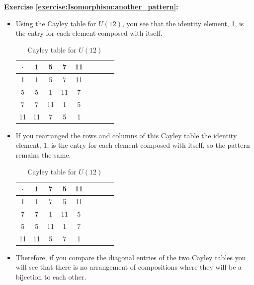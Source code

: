 \noindent\textbf{Exercise \ref{exercise:Isomorphism:another_pattern}:}
\begin{itemize}
\item
Using the Cayley table for $U(12)$, you see that the identity element, 1, is the entry for each element composed with itself.
\begin{table}[H]
\caption{Cayley table for $U(12)$}
{\small
\begin{center}
\begin{tabular}{c|cccccccc}
$\cdot$ & 1 & 5 & 7 & 11  \\
\hline
1        & 1 & 5 & 7 & 11  \\
5       & 5 & 1 & 11 & 7 \\
7       & 7 & 11 & 1 & 5  \\
11      & 11 & 7 & 5 & 1 \\
\end{tabular}
\end{center}
}
\end{table}

\item
If you rearranged the rows and columns of this Cayley table the identity element, 1, is the entry for each element composed with itself, so the pattern remains the same.
\begin{table}[H]
\caption{Cayley table for $U(12)$}
{\small
\begin{center}
\begin{tabular}{c|cccccccc}
$\cdot$ & 1 & 7 & 5 & 11  \\
\hline
1        & 1 & 7 & 5 & 11  \\
7       & 7 & 1 & 11 & 5 \\
5      & 5 & 11 & 1 & 7  \\
11      & 11 & 5 & 7 & 1 \\
\end{tabular}
\end{center}
}
\end{table}

\item
Therefore, if you compare the diagonal entries of the two Cayley tables you will see that there is no arrangement of compositions where they will be a bijection to each other.
\end{itemize}

